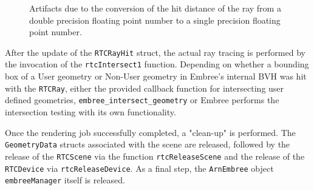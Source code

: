 \begin{figure}[!tbp]
	\centering
	\hfill
	\caption{Artifacts due to the conversion of the hit distance of the ray from a double precision floating point number to a single precision floating point number.}
	\label{fig:offset}
\end{figure}

After the update of the \texttt{RTCRayHit} struct, the actual ray tracing is performed by the invocation of the \texttt{rtcIntersect1} function. Depending on whether a bounding box of a User geometry or Non-User geometry in Embree's internal BVH was hit with the \texttt{RTCRay}, either the provided callback function for intersecting user defined geometries, \texttt{embree\_intersect\_geometry} or Embree performs the intersection testing with its own functionality. 

Once the rendering job successfully completed, a "clean-up" is performed. The \texttt{GeometryData} structs associated with the scene are released, followed by the release of the \texttt{RTCScene} via the function \texttt{rtcReleaseScene} and the release of the \texttt{RTCDevice} via \texttt{rtcReleaseDevice}. As a final step, the \texttt{ArnEmbree} object \texttt{embreeManager} itself is released.



